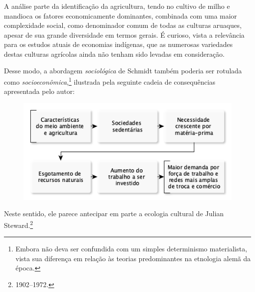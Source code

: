 A análise parte da identificação da agricultura, tendo no cultivo de milho e mandioca os fatores economicamente dominantes, combinada com uma maior complexidade social, como denominador comum de todas as culturas aruaques, apesar de sua grande diversidade em termos gerais. É curioso, vista a relevância para os estudos atuais de economias indígenas, que as numerosas variedades destas culturas agrícolas ainda não tenham sido levadas em consideração.

Desse modo, a abordagem \textit{sociológica} de Schmidt também poderia ser
rotulada como \textit{socioeconômica},\footnote{Embora não deva ser confundida com um
simples determinismo materialista, vista sua diferença em relação às teorias
predominantes na etnologia alemã da época.} ilustrada pela seguinte cadeia de 
consequências apresentada pelo autor:
\medskip

\begin{figure}[H]
  \includegraphics[width=\textwidth]{./TABELA.png}  
\end{figure}

\medskip
Neste sentido, ele parece antecipar em parte a
ecologia cultural de Julian Steward.\footnote{1902--1972.}

